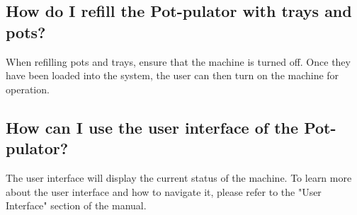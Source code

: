 \documentclass{article}
\begin{document}
\subsection{How do I refill the Pot-pulator with trays and pots?}
When refilling pots and trays, ensure that the machine is turned off. Once they have been loaded into the system, the user can then turn on the machine for operation.
\subsection{How can I use the user interface of the Pot-pulator?}
The user interface will display the current status of the machine. To learn more about the user interface and how to navigate it, please refer to the "User Interface" section of the manual.
\end{document}
